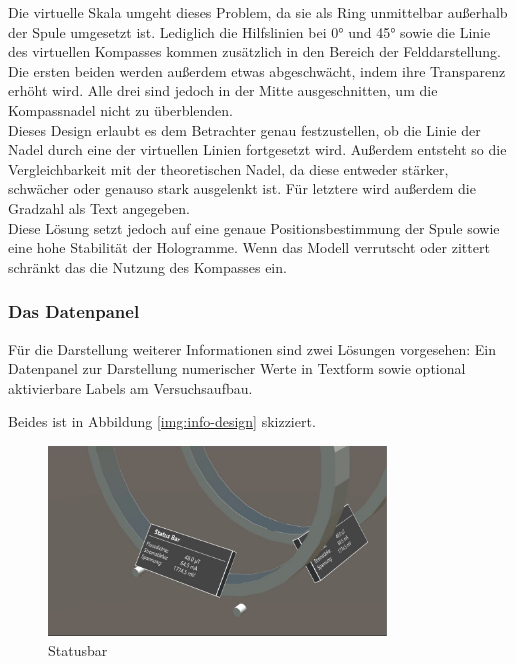 Die virtuelle Skala umgeht dieses Problem, da sie als Ring unmittelbar außerhalb der Spule umgesetzt ist. Lediglich die Hilfslinien bei 0° und 45° sowie die Linie des virtuellen Kompasses kommen zusätzlich in den Bereich der Felddarstellung. Die ersten beiden werden außerdem etwas abgeschwächt, indem ihre Transparenz erhöht wird. Alle drei sind jedoch in der Mitte ausgeschnitten, um die Kompassnadel nicht zu überblenden.\\

Dieses Design erlaubt es dem Betrachter genau festzustellen, ob die Linie der Nadel durch eine der virtuellen Linien fortgesetzt wird. Außerdem entsteht so die Vergleichbarkeit mit der theoretischen Nadel, da diese entweder stärker, schwächer oder genauso stark ausgelenkt ist. Für letztere wird außerdem die Gradzahl als Text angegeben.\\

Diese Lösung setzt jedoch auf eine genaue Positionsbestimmung der Spule sowie eine hohe Stabilität der Hologramme. Wenn das Modell verrutscht oder zittert schränkt das die Nutzung des Kompasses ein.

\subsubsection{Das Datenpanel} 
\label{sec-4-2-5}
Für die Darstellung weiterer Informationen sind zwei Lösungen vorgesehen: Ein Datenpanel zur Darstellung numerischer Werte in Textform sowie optional aktivierbare Labels am Versuchsaufbau.

Beides ist in Abbildung \ref{img:info-design} skizziert.


\begin{figure}[H]
\centering
\includegraphics[width=0.8\textwidth]{images/status.jpg}
\caption{Statusbar}
\label{img:status}
\end{figure}


